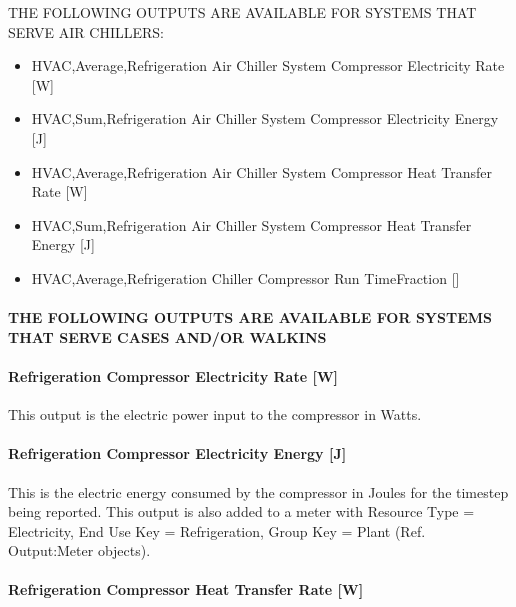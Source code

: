 THE FOLLOWING OUTPUTS ARE AVAILABLE FOR SYSTEMS THAT SERVE AIR CHILLERS:

\begin{itemize}
\item
  HVAC,Average,Refrigeration Air Chiller System Compressor Electricity Rate {[}W{]}
\item
  HVAC,Sum,Refrigeration Air Chiller System Compressor Electricity Energy {[}J{]}
\item
  HVAC,Average,Refrigeration Air Chiller System Compressor Heat Transfer Rate {[}W{]}
\item
  HVAC,Sum,Refrigeration Air Chiller System Compressor Heat Transfer Energy {[}J{]}
\item
  HVAC,Average,Refrigeration Chiller Compressor Run TimeFraction {[]}
\end{itemize}

\paragraph{THE FOLLOWING OUTPUTS ARE AVAILABLE FOR SYSTEMS THAT SERVE CASES AND/OR WALKINS}\label{the-following-outputs-are-available-for-systems-that-serve-cases-andor-walkins-1}

\paragraph{Refrigeration Compressor Electricity Rate {[}W{]}}\label{refrigeration-compressor-electric-power-w}

This output is the electric power input to the compressor in Watts.

\paragraph{Refrigeration Compressor Electricity Energy {[}J{]}}\label{refrigeration-compressor-electric-energy-j}

This is the electric energy consumed by the compressor in Joules for the timestep being reported. This output is also added to a meter with Resource Type = Electricity, End Use Key = Refrigeration, Group Key = Plant (Ref. Output:Meter objects).

\paragraph{Refrigeration Compressor Heat Transfer Rate {[}W{]}}\label{refrigeration-compressor-heat-transfer-rate-w}

